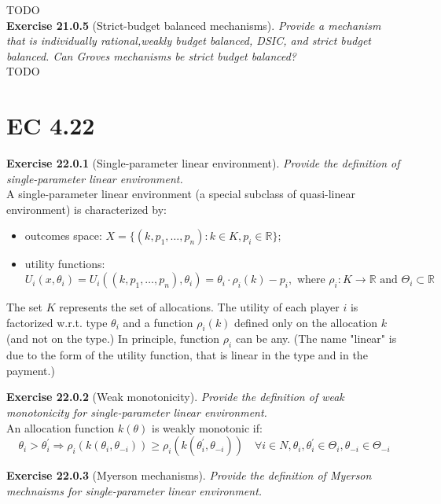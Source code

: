 TODO\\

\textbf{Exercise 21.0.5} (Strict-budget balanced mechanisms). \textit{Provide a mechanism that is individually rational,weakly budget balanced, DSIC, and strict budget balanced. Can Groves mechanisms be strict budget balanced?}\\

TODO\\

\section{EC 4.22}

\textbf{Exercise 22.0.1} (Single-parameter linear environment). \textit{Provide the definition of single-parameter linear environment.}\\

A single-parameter linear environment (a special subclass of quasi-linear environment) is characterized by:
\begin{itemize}
\item outcomes space: $X = \{ (k, p_1, \ldots, p_n): k \in K, p_i \in \mathbb{R}\}$;
\item utility functions: $U_{i}\left(x, \theta_{i}\right)=U_{i}\left(\left(k, p_{1}, \ldots, p_{n}\right), \theta_{i}\right)=\theta_{i} \cdot \rho_{i}(k)-p_{i}, \text { where } \rho_{i}: K \rightarrow \mathbb{R} \text { and } \Theta_{i} \subset \mathbb{R}$
\end{itemize}
The set $K$ represents the set of allocations. The utility of each player $i$ is factorized w.r.t. type $\theta_i$ and a function $\rho_i(k)$ defined only on the allocation $k$ (and not on the type.) In principle, function $\rho_i$ can be any. (The name "linear" is due to the form of the utility function, that is linear in the type and in the payment.)

\textbf{Exercise 22.0.2} (Weak monotonicity). \textit{Provide the definition of weak monotonicity for single-parameter linear environment.}\\

An allocation function $k(\theta)$ is weakly monotonic if:
$$
\theta_{i}>\theta_{i}^{\prime} \Rightarrow \rho_{i}\left(k\left(\theta_{i}, \theta_{-i}\right)\right) \geqslant \rho_{i}\left(k\left(\theta_{i}^{\prime}, \theta_{-i}\right)\right) \quad \forall i \in N, \theta_{i}, \theta_{i}^{\prime} \in \Theta_{i}, \theta_{-i} \in \Theta_{-i}
$$

\textbf{Exercise 22.0.3} (Myerson mechanisms). \textit{Provide the definition of Myerson mechnaisms for single-parameter linear environment.}\\

